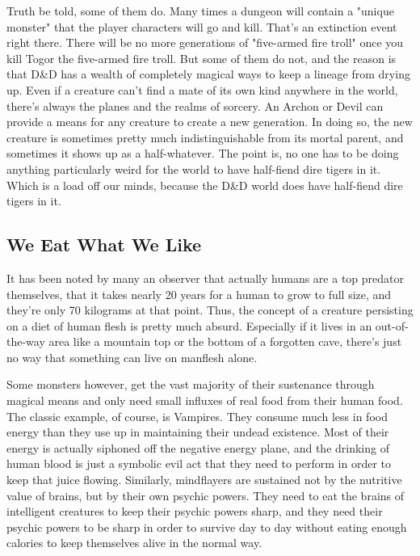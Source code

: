 Truth be told, some of them do. Many times a dungeon will contain a "unique monster" that the player characters will go and kill. That's an extinction event right there. There will be no more generations of "five-armed fire troll" once you kill Togor the five-armed fire troll. But some of them do not, and the reason is that D\&D has a wealth of completely magical ways to keep a lineage from drying up. Even if a creature can't find a mate of its own kind anywhere in the world, there's always the planes and the realms of sorcery. An Archon or Devil can provide a means for any creature to create a new generation. In doing so, the new creature is sometimes pretty much indistinguishable from its mortal parent, and sometimes it shows up as a half-whatever. The point is, no one has to be doing anything particularly weird for the world to have half-fiend dire tigers in it. Which is a load off our minds, because the D\&D world does have half-fiend dire tigers in it.

\subsection{We Eat What We Like}

It has been noted by many an observer that actually humans are a top predator themselves, that it takes nearly 20 years for a human to grow to full size, and they're only 70 kilograms at that point. Thus, the concept of a creature persisting on a diet of human flesh is pretty much absurd. Especially if it lives in an out-of-the-way area like a mountain top or the bottom of a forgotten cave, there's just no way that something can live on manflesh alone.

Some monsters however, get the vast majority of their sustenance through magical means and only need small influxes of real food from their human food. The classic example, of course, is Vampires. They consume much less in food energy than they use up in maintaining their undead existence. Most of their energy is actually siphoned off the negative energy plane, and the drinking of human blood is just a symbolic evil act that they need to perform in order to keep that juice flowing. Similarly, mindflayers are sustained not by the nutritive value of brains, but by their own psychic powers. They need to eat the brains of intelligent creatures to keep their psychic powers sharp, and they need their psychic powers to be sharp in order to survive day to day without eating enough calories to keep themselves alive in the normal way.

